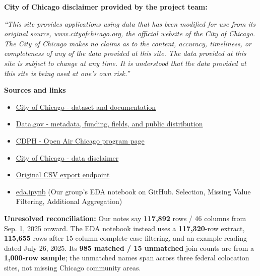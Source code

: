 \documentclass[10pt,letterpaper]{article}
\begin{document}
\vspace{7pt}
\noindent\textbf{City of Chicago disclaimer provided by the project team:}\par\smallskip
\begingroup\small\itshape
\noindent ``This site provides applications using data that has been modified for use from its original source, www.cityofchicago.org, the official website of the City of Chicago. The City of Chicago makes no claims as to the content, accuracy, timeliness, or completeness of any of the data provided at this site. The data provided at this site is subject to change at any time. It is understood that the data provided at this site is being used at one's own risk.''
\endgroup\par
\vspace{10pt}
\noindent\textbf{Sources and links}\par
\begin{itemize}[noitemsep,topsep=4pt,leftmargin=16pt]
  \item \href{https://data.cityofchicago.org/Health-Human-Services/Open-Air-Chicago-Day-Aggregations/rtmx-vkjr/about_data}{City of Chicago - dataset and documentation}
  \item \href{https://catalog.data.gov/dataset/open-air-chicago-day-aggregations}{Data.gov - metadata, funding, fields, and public distribution}
  \item \href{https://www.chicago.gov/city/en/depts/cdph/supp_info/Environment/open-air-chicago.html}{CDPH - Open Air Chicago program page}
  \item \href{https://www.chicago.gov/city/en/narr/foia/data_disclaimer.html}{City of Chicago - data disclaimer}
  \item \href{https://data.cityofchicago.org/api/v3/views/rtmx-vkjr/export.csv?accessType=DOWNLOAD}{Original CSV export endpoint}
  \item \href{https://github.com/doctorplatypus/Socioeconomic-Health-Disparities/blob/main/EDA-Files/eda.ipynb}{eda.ipynb} (Our group's EDA notebook on GitHub. Selection, Missing Value Filtering, Additional Aggregation)
\end{itemize}
\noindent\textbf{Unresolved reconciliation:} Our notes say \textbf{117,892} rows / 46 columns from Sep. 1, 2025 onward. The EDA notebook instead uses a \textbf{117,320}-row extract, \textbf{115,655} rows after 15-column complete-case filtering, and an example reading dated July 26, 2025. Its \textbf{985 matched / 15 unmatched} join counts are from a \textbf{1,000-row sample}; the unmatched names span across three federal colocation sites, not missing Chicago community areas. \par
\end{document}
